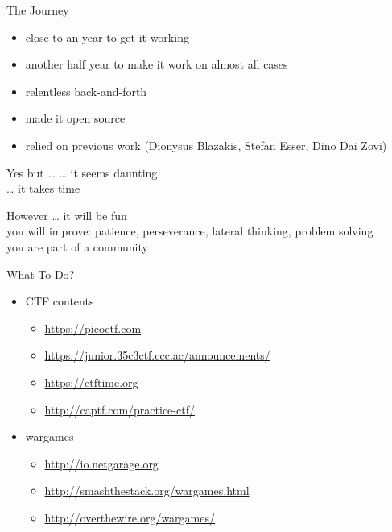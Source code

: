 \documentclass{simple}
\begin{document}
\begin{frame}{The Journey}
  \begin{itemize}
    \pause \item close to an year to get it working
    \pause \item another half year to make it work on almost all cases
    \pause \item relentless back-and-forth
    \pause \item made it open source
    \pause \item relied on previous work (Dionysus Blazakis, Stefan Esser, Dino Dai Zovi)
  \end{itemize}
\end{frame}

\begin{frame}{Yes but \ldots}
  \centering
  \pause \ldots{} it seems daunting \\
  \pause \ldots{} it takes time
\end{frame}

\begin{frame}{However \ldots}
  \centering
  \pause it will be fun \\
  \pause you will improve: patience, perseverance, lateral thinking, problem solving \\
  \pause you are part of a community
\end{frame}

\begin{frame}{What To Do?}
  \begin{itemize}
    \item \pause CTF contents
      \begin{itemize}
        \item \pause \url{https://picoctf.com}
        \item \pause \url{https://junior.35c3ctf.ccc.ac/announcements/}
        \item \pause \url{https://ctftime.org}
        \item \pause \url{http://captf.com/practice-ctf/}
      \end{itemize}
    \item \pause wargames
      \begin{itemize}
        \item \pause \url{http://io.netgarage.org}
        \item \pause \url{http://smashthestack.org/wargames.html}
        \item \pause \url{http://overthewire.org/wargames/}
      \end{itemize}
  \end{itemize}
\end{frame}
\end{document}
